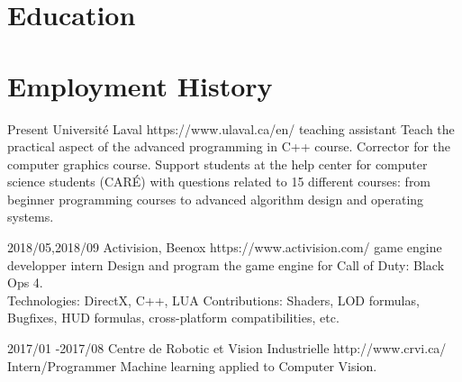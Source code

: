 \documentclass[10pt]{article} %
\begin{document}
\section{Education}






\section{Employment History}

\job
{}{Present}
{Université Laval}
{https://www.ulaval.ca/en/}
{teaching assistant}
{Teach the practical aspect of the advanced programming in C++ course. Corrector for the computer graphics course. Support students at the help center for computer science students (CARÉ) with questions related to 15 different courses: from beginner programming courses to advanced algorithm design and operating systems.}

\job
{2018/05,}{2018/09}
{Activision, Beenox}
{https://www.activision.com/}
{game engine developper intern}
{Design and program the game engine for Call of Duty: Black Ops 4.\\
 Technologies: DirectX, C++, LUA 
 Contributions: Shaders, LOD formulas, Bugfixes, HUD formulas, cross-platform compatibilities, etc.}


\job
{2017/01 -}{2017/08}
{Centre de Robotic et Vision Industrielle}
{http://www.crvi.ca/}
{Intern/Programmer}
{Machine learning applied to Computer Vision.}
\end{document}
